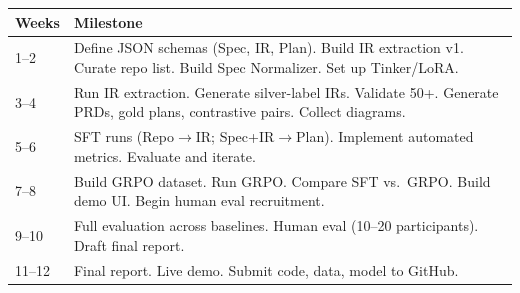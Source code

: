 \documentclass{article}
\begin{document}
\medskip\noindent
\begin{tabular}{@{}lp{9.5cm}@{}}
\toprule
\textbf{Weeks} & \textbf{Milestone} \\
\midrule
1--2 & Define JSON schemas (Spec, IR, Plan). Build IR extraction v1. Curate repo list. Build Spec Normalizer. Set up Tinker/LoRA. \\
3--4 & Run IR extraction. Generate silver-label IRs. Validate 50+. Generate PRDs, gold plans, contrastive pairs. Collect diagrams. \\
5--6 & SFT runs (Repo$\to$IR; Spec+IR$\to$Plan). Implement automated metrics. Evaluate and iterate. \\
7--8 & Build GRPO dataset. Run GRPO. Compare SFT vs.\ GRPO. Build demo UI. Begin human eval recruitment. \\
9--10 & Full evaluation across baselines. Human eval (10--20 participants). Draft final report. \\
11--12 & Final report. Live demo. Submit code, data, model to GitHub. \\
\bottomrule
\end{tabular}

\newpage


\end{document}
